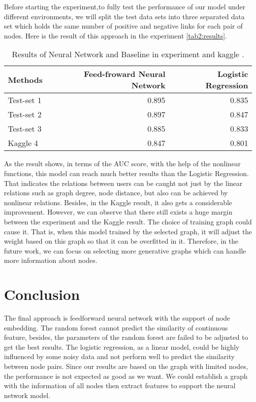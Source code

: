 \documentclass[a4paper,11pt]{article}
\begin{document}
Before starting the experiment,to fully test the performance of our model under different environments, we will split the test data sets into three separated data set which holds the same number of positive and negative links for each pair of nodes.  Here is the result of this approach in the experiment \autoref{tab2:results}.

\begin{table}[h]
  \centering
  \begin{tabular}{lrr}
    \toprule
    Methods & Feed-froward Neural Network & Logistic Regression\\
    \midrule
    Test-set 1  & 0.895 & 0.835\\
    Test-set 2 & 0.897 & 0.847\\
    Test-set 3 & 0.885 & 0.833\\
    Kaggle 4 & 0.847 & 0.801\\
    \bottomrule
  \end{tabular}
  \caption{Results of Neural Network and Baseline in experiment and kaggle .}\label{tab2:results}
\end{table}
As the result shows, in terms of the AUC score, with the help of the nonlinear functions, this model can reach much better results than the Logistic Regression. That indicates the relations between users can be caught not just by the linear relations such as graph degree, node distance, but also can be achieved by nonlinear relations. Besides, in the Kaggle result, it also gets a considerable improvement. However, we can observe that there still exists a huge margin between the experiment and the Kaggle result. The choice of training graph could cause it. That is, when this model trained by the selected graph, it will adjust the weight based on this graph so that it can be overfitted in it. Therefore, in the future work, we can focus on selecting more generative graphs which can handle more information about nodes.
\section{Conclusion}
The final approach is feedforward neural network with the support of node embedding. The random forest cannot predict the similarity of continuous feature, besides, the parameters of the random forest are failed to be adjusted to get the best results. The logistic regression, as a linear model, could be highly influenced by some noisy data and not perform well to predict the similarity between node pairs. Since our results are based on the graph with limited nodes, the performance is not expected as good as we want. We could establish a graph with the information of all nodes then extract features to support the neural network model.
\end{document}
